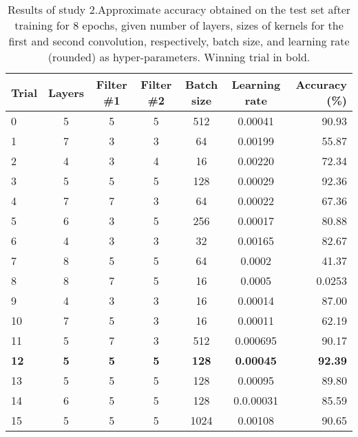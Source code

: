 \documentclass[british,12p]{article}
\begin{document}
	     \begin{table}[h!]
	\begin{center}
    \begin{tabular}{l||c|c|c|c|c||r}
  		Trial & Layers  & Filter \#1 & Filter \#2 & Batch size & Learning rate & Accuracy (\%) \\
  		\hline\hline
  		0 & 5 & 5 & 5 & 512 & 0.00041 & 90.93\\\hline
  		1 & 7 & 3 & 3 & 64 & 0.00199 & 55.87\\\hline
  		2 & 4 & 3 & 4 & 16 & 0.00220 & 72.34\\\hline
  		3 & 5 & 5 & 5 & 128 & 0.00029 & 92.36\\\hline
  		4 & 7 & 7 & 3 & 64 & 0.00022 & 67.36\\\hline
  		5 & 6 & 3 & 5 & 256 & 0.00017 & 80.88\\\hline
  		6 & 4 & 3 & 3 & 32 & 0.00165 & 82.67\\\hline
  		7 & 8 & 5 & 5 & 64 & 0.0002 & 41.37\\\hline
  		8 & 8 & 7 & 5 & 16 & 0.0005 & 0.0253\\\hline
  		9 & 4 & 3 & 3 & 16 & 0.00014 & 87.00\\\hline
  		10 & 7 & 5 & 3 & 16 & 0.00011 & 62.19\\\hline
  		11 & 5 & 7 & 3 & 512 & 0.000695 & 90.17\\\hline
  		\textbf{12} & \textbf{5} & \textbf{5} & \textbf{5} & \textbf{128} & \textbf{0.00045} & \textbf{92.39}\\\hline
  		13 & 5 & 5 & 5 & 128 & 0.00095 & 89.80\\\hline
  		14 & 6 & 5 & 5 & 128 & 0.0.00031 & 85.59 \\\hline
  		15 & 5 & 5 & 5 & 1024 & 0.00108 & 90.65
  		 
	\end{tabular}
	\caption{Results of study 2.Approximate accuracy obtained on the test set after training for 8 epochs, given number of layers, sizes of kernels for the first and second convolution, respectively, batch size, and learning rate (rounded) as hyper-parameters. Winning trial in bold.}
		\label{tab-res2}
	\end{center}

	 \end{table}
\end{document}

